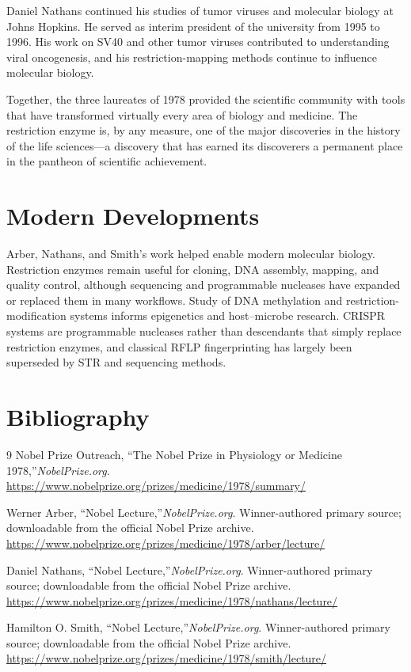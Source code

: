 Daniel Nathans continued his studies of tumor viruses and molecular biology at Johns Hopkins. He served as interim president of the university from 1995 to 1996. His work on SV40 and other tumor viruses contributed to understanding viral oncogenesis, and his restriction-mapping methods continue to influence molecular biology.

Together, the three laureates of 1978 provided the scientific community with tools that have transformed virtually every area of biology and medicine. The restriction enzyme is, by any measure, one of the major discoveries in the history of the life sciences---a discovery that has earned its discoverers a permanent place in the pantheon of scientific achievement.


\section{Modern Developments}

Arber, Nathans, and Smith's work helped enable modern molecular biology. Restriction enzymes remain useful for cloning, DNA assembly, mapping, and quality control, although sequencing and programmable nucleases have expanded or replaced them in many workflows. Study of DNA methylation and restriction-modification systems informs epigenetics and host--microbe research. CRISPR systems are programmable nucleases rather than descendants that simply replace restriction enzymes, and classical RFLP fingerprinting has largely been superseded by STR and sequencing methods.


\section{Bibliography}

\begin{thebibliography}{9}
Nobel Prize Outreach, ``The Nobel Prize in Physiology or Medicine 1978,''\emph{NobelPrize.org}.\\
\url{https://www.nobelprize.org/prizes/medicine/1978/summary/}

Werner Arber, ``Nobel Lecture,''\emph{NobelPrize.org}. Winner-authored primary source; downloadable from the official Nobel Prize archive.\\
\url{https://www.nobelprize.org/prizes/medicine/1978/arber/lecture/}

Daniel Nathans, ``Nobel Lecture,''\emph{NobelPrize.org}. Winner-authored primary source; downloadable from the official Nobel Prize archive.\\
\url{https://www.nobelprize.org/prizes/medicine/1978/nathans/lecture/}

Hamilton O. Smith, ``Nobel Lecture,''\emph{NobelPrize.org}. Winner-authored primary source; downloadable from the official Nobel Prize archive.\\
\url{https://www.nobelprize.org/prizes/medicine/1978/smith/lecture/}
\end{thebibliography}
